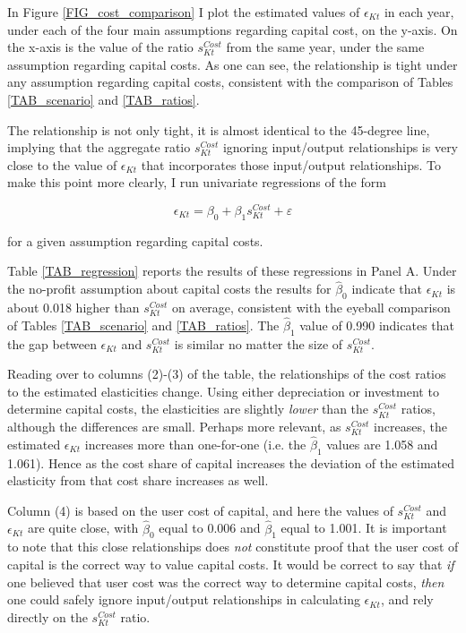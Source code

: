 In Figure \ref{FIG_cost_comparison} I plot the estimated values of $\epsilon_{Kt}$ in each year, under each of the four main assumptions regarding capital cost, on the y-axis. On the x-axis is the value of the ratio $s^{Cost}_{Kt}$ from the same year, under the same assumption regarding capital costs. As one can see, the relationship is tight under any assumption regarding capital costs, consistent with the comparison of Tables \ref{TAB_scenario} and \ref{TAB_ratios}. 

The relationship is not only tight, it is almost identical to the 45-degree line, implying that the  aggregate ratio $s^{Cost}_{Kt}$ ignoring input/output relationships is very close to the value of $\epsilon_{Kt}$ that incorporates those input/output relationships. To make this point more clearly, I run univariate regressions of the form

\begin{equation}
	\epsilon_{Kt} = \beta_0 + \beta_1 s^{Cost}_{Kt} + \varepsilon
\end{equation}

for a given assumption regarding capital costs. 

Table \ref{TAB_regression} reports the results of these regressions in Panel A. Under the no-profit assumption about capital costs the results for $\hat{\beta}_0$ indicate that $\epsilon_{Kt}$ is about 0.018 higher than $s^{Cost}_{Kt}$ on average, consistent with the eyeball comparison of Tables \ref{TAB_scenario} and \ref{TAB_ratios}. The $\hat{\beta}_1$ value of 0.990 indicates that the gap between $\epsilon_{Kt}$ and $s^{Cost}_{Kt}$ is similar no matter the size of $s^{Cost}_{Kt}$.

Reading over to columns (2)-(3) of the table, the relationships of the cost ratios to the estimated elasticities change. Using either depreciation or investment to determine capital costs, the elasticities are slightly \textit{lower} than the $s^{Cost}_{Kt}$ ratios, although the differences are small. Perhaps more relevant, as $s^{Cost}_{Kt}$ increases, the estimated $\epsilon_{Kt}$ increases more than one-for-one (i.e. the $\hat{\beta}_1$ values are 1.058 and 1.061). Hence as the cost share of capital increases the deviation of the estimated elasticity from that cost share increases as well. 

Column (4) is based on the user cost of capital, and here the values of $s^{Cost}_{Kt}$ and $\epsilon_{Kt}$ are quite close, with $\hat{\beta}_0$ equal to 0.006 and $\hat{\beta}_1$ equal to 1.001. It is important to note that this close relationships does \textit{not} constitute proof that the user cost of capital is the correct way to value capital costs. It would be correct to say that \textit{if} one believed that user cost was the correct way to determine capital costs, \textit{then} one could safely ignore input/output relationships in calculating $\epsilon_{Kt}$, and rely directly on the $s^{Cost}_{Kt}$ ratio. 

